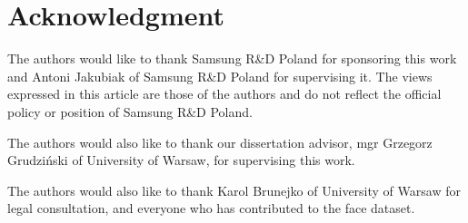 \section*{Acknowledgment}
The authors would like to thank Samsung R\&D Poland for sponsoring this work
and Antoni Jakubiak of Samsung R\&D Poland for supervising it.
The views expressed in this article are those of the authors and do not reflect
the official policy or position of Samsung R\&D Poland.

\bigskip
The authors would also like to thank our dissertation advisor, mgr Grzegorz Grudziński
of University of Warsaw, for supervising this work.

\bigskip
The authors would also like to thank Karol Brunejko of University of Warsaw
for legal consultation, and everyone who has contributed to the face dataset.
